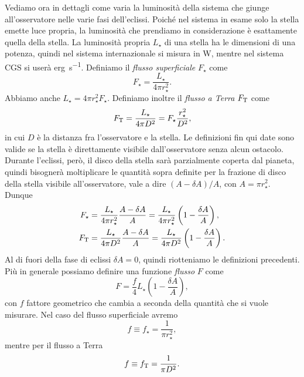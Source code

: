 Vediamo ora in dettagli come varia la luminosità della sistema che giunge
all'osservatore nelle varie fasi dell'eclissi. Poiché nel sistema in esame solo
la stella emette luce propria, la luminosità che prendiamo in considerazione è
esattamente quella della stella. La luminosità propria $L_\star$ di una stella
ha le dimensioni di una potenza, quindi nel sistema internazionale si misura in
\si{\watt}, mentre nel sistema CGS si userà \si{erg\per \second}. Definiamo il
\emph{flusso superficiale} $F_\star$ come
\begin{equation}
    F_\star = \frac{L_\star}{4\pi r_\star^2}.
\end{equation}
Abbiamo anche $L_\star = 4\pi r_\star^2 F_\star$. Definiamo inoltre il
\emph{flusso a Terra} $F_{\textup{T}}$ come
\begin{equation}
  F_{\textup{T}} = \frac{L_\star}{4\pi D^2} = F_\star \frac{r_\star^2}{D^2},
\end{equation}
in cui $D$ è la distanza fra l'osservatore e la stella. Le definizioni fin qui
date sono valide se la stella è direttamente visibile dall'osservatore senza
alcun ostacolo. Durante l'eclissi, però, il disco della stella sarà parzialmente
coperta dal pianeta, quindi bisognerà moltiplicare le quantità sopra definite
per la frazione di disco della stella visibile all'osservatore, vale a dire
$(A - \delta A)/A$, con $A= \pi r_\star^2$. Dunque
\begin{align}
  F_\star &= \frac{L_\star}{4\pi r_\star^2} \frac{A - \delta A}{A} =
  \frac{L_\star}{4\pi r_\star^2} \left( 1 - \frac{\delta A}{A} \right), \\
  F_{\textup{T}} &= \frac{L_\star}{4\pi D^2} \frac{A - \delta A}{A} =
  \frac{L_\star}{4\pi D^2} \left( 1 - \frac{\delta A}{A} \right).
\end{align}
Al di fuori della fase di eclissi $\delta A = 0$, quindi riotteniamo le
definizioni precedenti. Più in generale possiamo definire una funzione
\emph{flusso} $F$ come
\begin{equation}
  F = \frac{f}{4} L_\star \left( 1 - \frac{\delta A}{A} \right),
\end{equation}
con $f$ fattore geometrico che cambia a seconda della quantità che si vuole
misurare. Nel caso del flusso superficiale avremo
\begin{equation}
  f \equiv f_\star = \frac{1}{\pi r_\star^2},
\end{equation}
mentre per il flusso a Terra
\begin{equation}
  f \equiv f_{\textup{T}} = \frac{1}{\pi D^2}.
\end{equation}

